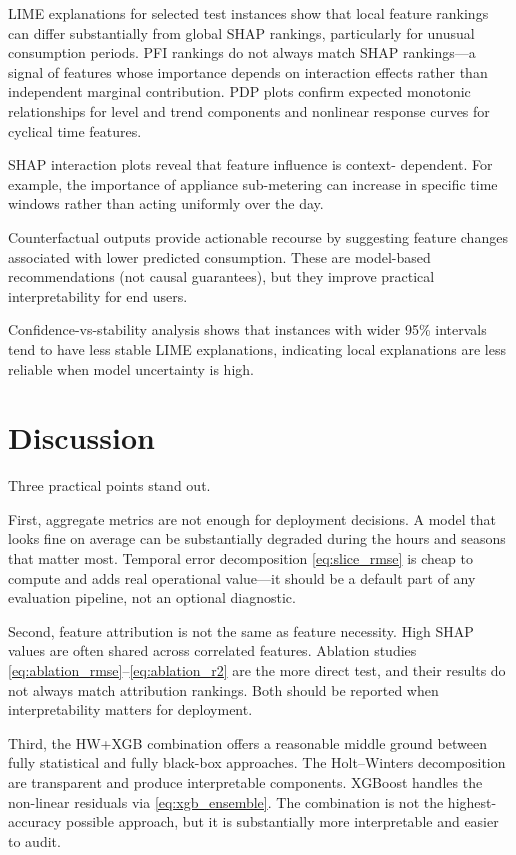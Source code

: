 \documentclass[10pt,twocolumn,letterpaper]{article}
\begin{document}
LIME explanations for selected test instances show that local feature
rankings can differ substantially from global SHAP rankings,
particularly for unusual consumption periods. PFI rankings do not always
match SHAP rankings---a signal of
features whose importance depends on interaction effects rather than
independent marginal contribution. PDP plots
confirm expected monotonic relationships for level and trend
components and nonlinear response curves for cyclical time features.

SHAP interaction plots reveal that feature influence is context-
dependent. For example, the importance of appliance sub-metering can
increase in specific time windows rather than acting uniformly over the
day.

Counterfactual outputs provide actionable recourse by suggesting
feature changes associated with lower predicted consumption. These are
model-based recommendations (not causal guarantees), but they improve
practical interpretability for end users.

Confidence-vs-stability analysis shows that instances with wider 95\%
intervals tend to have less stable LIME explanations, indicating local
explanations are less reliable when model uncertainty is high.

\section{Discussion}

Three practical points stand out.

First, aggregate metrics are not enough for deployment decisions. A
model that looks fine on average can be substantially degraded during
the hours and seasons that matter most. Temporal error decomposition
\eqref{eq:slice_rmse} is cheap to compute and adds real operational
value---it should be a default part of any evaluation pipeline, not
an optional diagnostic.

Second, feature attribution is not the same as feature necessity.
High SHAP values are often shared across
correlated features. Ablation studies
\eqref{eq:ablation_rmse}--\eqref{eq:ablation_r2} are the more direct
test, and their results do not always match attribution rankings.
Both should be reported when interpretability matters for deployment.

Third, the HW+XGB combination offers a reasonable middle ground
between fully statistical and fully black-box approaches. The
Holt--Winters decomposition
are transparent and produce interpretable components. XGBoost handles
the non-linear residuals via \eqref{eq:xgb_ensemble}. The combination
is not the highest-accuracy possible approach, but it is
substantially more interpretable and easier to audit.
\end{document}
